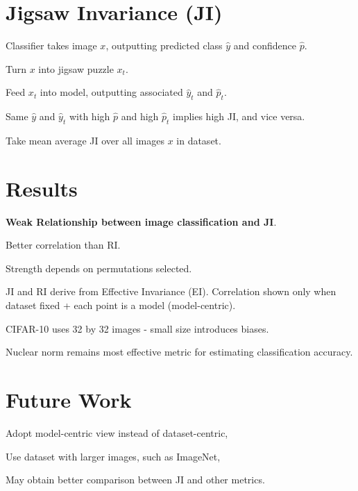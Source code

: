 \documentclass[a4paper]{article}
\begin{document}
{\begin{multicols}{2}
        \section{Jigsaw Invariance (JI)}
        \begin{compactenum}
            \item Classifier takes image \(x\), outputting predicted class \(\hat{y}\) and confidence \(\hat{p}\).
            \item Turn \(x\) into jigsaw puzzle \(x_t\).
            \item Feed \(x_t\) into model, outputting associated \(\hat{y}_t\) and \(\hat{p}_t\).
            \item Same \(\hat{y}\) and \(\hat{y}_t\) with high \(\hat{p}\) and high \(\hat{p}_t\) implies high JI, and vice versa.
            \item Take mean average JI over all images \(x\) in dataset.
        \end{compactenum}
        
        
    \columnbreak
        \section{Results}
        \vspace{-0.3cm}
        
        \begin{compactitem}
            \item \textbf{Weak Relationship between image classification and JI}.
            \item Better correlation than RI.
            \item Strength depends on permutations selected.
            \item JI and RI derive from Effective Invariance (EI). Correlation shown only when dataset fixed + each point is a model (model-centric).
            \item CIFAR-10 uses 32 by 32 images - small size introduces biases.
            \item Nuclear norm remains most effective metric for estimating classification accuracy.
        \end{compactitem}
        \vspace{-0.4cm}
        \section{Future Work}
        \vspace{-0.3cm}
        \begin{compactitem}
            \item Adopt model-centric view instead of dataset-centric,
            \item Use dataset with larger images, such as ImageNet,
            \item May obtain better comparison between JI and other metrics.
        \end{compactitem}
    \end{multicols}
}
\end{document}
